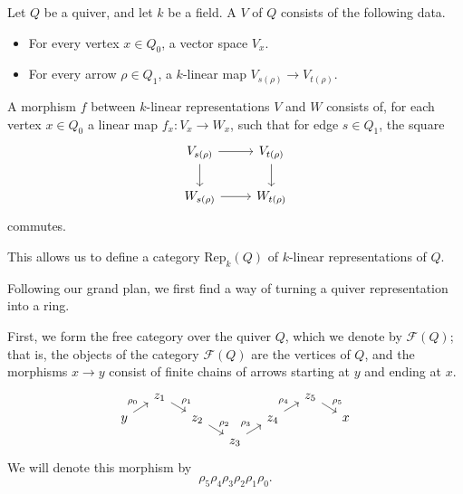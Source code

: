 \documentclass[main.tex]{subfiles}
\begin{document}
\begin{definition}
  \label{def:quiver_representation}
  Let $Q$ be a quiver, and let $k$ be a field. A  $V$ of $Q$ consists of the following data.
  \begin{itemize}
    \item For every vertex $x \in Q_{0}$, a vector space $V_{x}$.

    \item For every arrow $\rho \in Q_{1}$, a $k$-linear map $V_{s(\rho)} \to V_{t(\rho)}$.
  \end{itemize}
  A morphism $f$ between $k$-linear representations $V$ and $W$ consists of, for each vertex $x \in Q_{0}$ a linear map $f_{x}\colon V_{x} \to W_{x}$, such that for edge $s \in Q_{1}$, the square
  \begin{equation*}
    \begin{tikzcd}
      V_{s(\rho)}
      \arrow[r]
      \arrow[d]
      & V_{t(\rho)}
      \arrow[d]
      \\
      W_{s(\rho)}
      \arrow[r]
      & W_{t(\rho)}
    \end{tikzcd}
  \end{equation*}
  commutes.
\end{definition}

This allows us to define a category $\mathrm{Rep}_{k}(Q)$ of $k$-linear representations of $Q$.

Following our grand plan, we first find a way of turning a quiver representation into a ring.

First, we form the free category over the quiver $Q$, which we denote by $\mathcal{F}(Q)$; that is, the objects of the category $\mathcal{F}(Q)$ are the vertices of $Q$, and the morphisms $x \to y$ consist of finite chains of arrows starting at $y$ and ending at $x$.
\begin{equation*}
  \begin{tikzcd}[row sep=tiny, column sep=small]
    & z_{1}
    \arrow[dr, "\rho_{1}"]
    &&&& z_{5}
    \arrow[dr, "\rho_{5}"]
    \\
    y
    \arrow[ur, "\rho_{0}"]
    && z_{2}
    \arrow[dr, "\rho_{2}"]
    && z_{4}
    \arrow[ur, "\rho_{4}"]
    && x
    \\
    &&& z_{3}
    \arrow[ur, "\rho_{3}"]
  \end{tikzcd}
\end{equation*}
We will denote this morphism by
\begin{equation*}
  \rho_{5}\rho_{4}\rho_{3}\rho_{2}\rho_{1}\rho_{0}.
\end{equation*}
\end{document}
